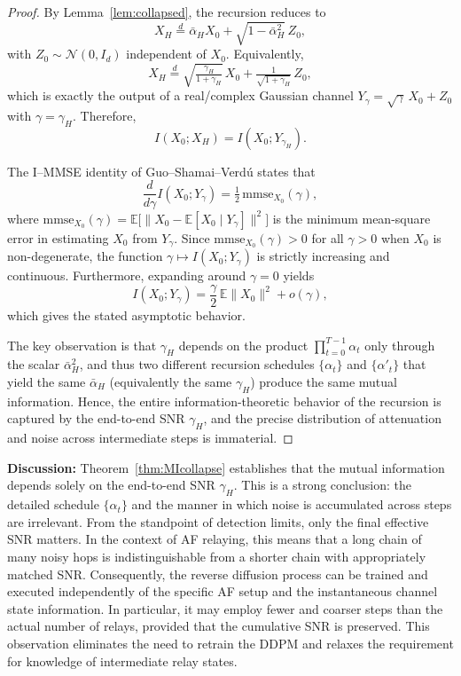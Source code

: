 \documentclass[journal]{IEEEtran}
\begin{document}
\begin{proof}
By Lemma~\ref{lem:collapsed}, the recursion reduces to
\[
X_H \stackrel{d}{=} \bar\alpha_H X_0 + \sqrt{1-\bar\alpha_H^2}\,Z_0,
\]
with $Z_0\sim\mathcal{N}(0,I_d)$ independent of $X_0$. 
Equivalently,
\[
X_H \stackrel{d}{=} \sqrt{\tfrac{\gamma_H}{1+\gamma_H}}\,X_0 + \tfrac{1}{\sqrt{1+\gamma_H}}\,Z_0,
\]
which is exactly the output of a real/complex Gaussian channel $Y_\gamma=\sqrt{\gamma}\,X_0+Z_0$ with $\gamma=\gamma_H$. 
Therefore,
\[
I(X_0;X_H)=I(X_0;Y_{\gamma_H}).
\]

The I--MMSE identity of Guo--Shamai--Verdú \cite{Guo2005I_MMSE} states that
\[
\frac{d}{d\gamma} I(X_0;Y_\gamma) = \tfrac{1}{2}\,\mathrm{mmse}_{X_0}(\gamma),
\]
where $\mathrm{mmse}_{X_0}(\gamma)=\mathbb{E}\!\big[\|X_0-\mathbb{E}[X_0\mid Y_\gamma]\|^2\big]$ is the minimum mean-square error in estimating $X_0$ from $Y_\gamma$. 
Since $\mathrm{mmse}_{X_0}(\gamma)>0$ for all $\gamma>0$ when $X_0$ is non-degenerate, the function $\gamma\mapsto I(X_0;Y_\gamma)$ is strictly increasing and continuous. 
Furthermore, expanding around $\gamma=0$ yields
\[
I(X_0;Y_\gamma)=\frac{\gamma}{2}\,\mathbb{E}\|X_0\|^2+o(\gamma),
\]
which gives the stated asymptotic behavior.

The key observation is that $\gamma_H$ depends on the product $\prod_{t=0}^{T-1}\alpha_t$ only through the scalar $\bar\alpha_H^2$, and thus two different recursion schedules $\{\alpha_t\}$ and $\{\alpha'_t\}$ that yield the same $\bar\alpha_H$ (equivalently the same $\gamma_H$) produce the same mutual information. 
Hence, the entire information-theoretic behavior of the recursion is captured by the end-to-end SNR $\gamma_H$, and the precise distribution of attenuation and noise across intermediate steps is immaterial.
\end{proof}


\noindent\textbf{Discussion:} 
Theorem~\ref{thm:MIcollapse} establishes that the mutual information depends solely on the end-to-end SNR $\gamma_H$. 
This is a strong conclusion: the detailed schedule $\{\alpha_t\}$ and the manner in which noise is accumulated across steps are irrelevant. 
From the standpoint of detection limits, only the final effective SNR matters. 
In the context of AF relaying, this means that a long chain of many noisy hops is indistinguishable from a shorter chain with appropriately matched SNR. 
Consequently, the reverse diffusion process can be trained and executed independently of the specific AF setup and the instantaneous channel state information. In particular, it may employ fewer and coarser steps than the actual number of relays, provided that the cumulative SNR is preserved. This observation eliminates the need to retrain the DDPM and relaxes the requirement for knowledge of intermediate relay states. 
\end{document}
